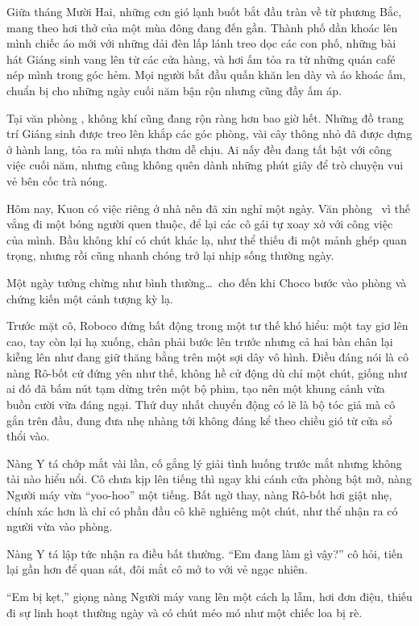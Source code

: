 \documentclass[../main.tex]{subfiles}
\begin{document}
Giữa tháng Mười Hai, những cơn gió lạnh buốt bắt đầu tràn về từ phương Bắc, mang theo hơi thở của một mùa đông đang đến gần. Thành phố dần khoác lên mình chiếc áo mới với những dải đèn lấp lánh treo dọc các con phố, những bài hát Giáng sinh vang lên từ các cửa hàng, và hơi ấm tỏa ra từ những quán café nép mình trong góc hẻm. Mọi người bắt đầu quấn khăn len dày và áo khoác ấm, chuẩn bị cho những ngày cuối năm bận rộn nhưng cũng đầy ấm áp.

Tại văn phòng \hll, không khí cũng đang rộn ràng hơn bao giờ hết. Những đồ trang trí Giáng sinh được treo lên khắp các góc phòng, vài cây thông nhỏ đã được dựng ở hành lang, tỏa ra mùi nhựa thơm dễ chịu. Ai nấy đều đang tất bật với công việc cuối năm, nhưng cũng không quên dành những phút giây để trò chuyện vui vẻ bên cốc trà nóng.

Hôm nay, Kuon có việc riêng ở nhà nên đã xin nghỉ một ngày. Văn phòng \hll\ vì thế vắng đi một bóng người quen thuộc, để lại các cô gái tự xoay xở với công việc của mình. Bầu không khí có chút khác lạ, như thể thiếu đi một mảnh ghép quan trọng, nhưng rồi cũng nhanh chóng trở lại nhịp sống thường ngày.

Một ngày tưởng chừng như bình thường\dots\ cho đến khi Choco bước vào phòng và chứng kiến một cảnh tượng kỳ lạ.

Trước mặt cô, Roboco đứng bất động trong một tư thế khó hiểu: một tay giơ lên cao, tay còn lại hạ xuống, chân phải bước lên trước nhưng cả hai bàn chân lại kiễng lên như đang giữ thăng bằng trên một sợi dây vô hình. Điều đáng nói là cô nàng Rô-bốt cứ đứng yên như thế, không hề cử động dù chỉ một chút, giống như ai đó đã bấm nút tạm dừng trên một bộ phim, tạo nên một khung cảnh vừa buồn cười vừa đáng ngại. Thứ duy nhất chuyển động có lẽ là bộ tóc giả mà cô gắn trên đầu, đung đưa nhẹ nhàng tới không đáng kể theo chiều gió từ cửa sổ thổi vào.


Nàng Y tá chớp mắt vài lần, cố gắng lý giải tình huống trước mắt nhưng không tài nào hiểu nổi. Cô chưa kịp lên tiếng thì ngay khi cánh cửa phòng bật mở, nàng Người máy vừa ``yoo-hoo'' một tiếng. Bất ngờ thay, nàng Rô-bốt hơi giật nhẹ, chính xác hơn là chỉ có phần đầu cô khẽ nghiêng một chút, như thể nhận ra có người vừa vào phòng.

Nàng Y tá lập tức nhận ra điều bất thường. ``Em đang làm gì vậy?'' cô hỏi, tiến lại gần hơn để quan sát, đôi mắt cô mở to với vẻ ngạc nhiên.

``Em bị kẹt,'' giọng nàng Người máy vang lên một cách lạ lẫm, hơi đơn điệu, thiếu đi sự linh hoạt thường ngày và có chút méo mó như một chiếc loa bị rè.
\end{document}
